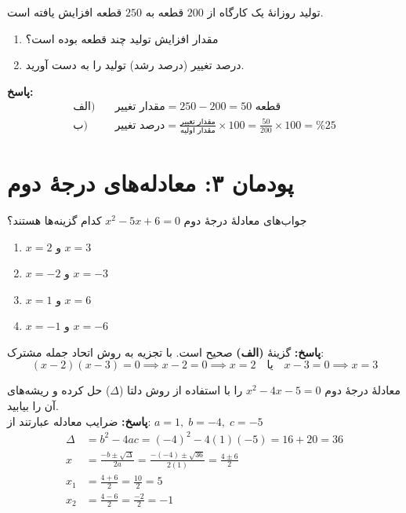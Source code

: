 \documentclass[a4paper,12pt]{article}
\begin{document}
\begin{tcolorbox}[title=\textbf{سؤال ۶ (تشریحی)}]
تولید روزانۀ یک کارگاه از $200$ قطعه به $250$ قطعه افزایش یافته است.
\begin{enumerate}[label=\textbf{\alph*)}]
    \item مقدار افزایش تولید چند قطعه بوده است؟
    \item درصد تغییر (درصد رشد) تولید را به دست آورید.
\end{enumerate}
\textbf{پاسخ:}
\begin{align*}
\text{الف)} \quad & \text{مقدار تغییر} = 250 - 200 = 50 \text{ قطعه} \\
\text{ب)} \quad & \text{درصد تغییر} = \frac{\text{مقدار تغییر}}{\text{مقدار اولیه}} \times 100 = \frac{50}{200} \times 100 = \%25
\end{align*}
\end{tcolorbox}

\newpage

\section*{پودمان ۳: معادله‌های درجۀ دوم}

\begin{tcolorbox}[title=\textbf{سؤال ۷ (تستی)}]
جواب‌های معادلۀ درجۀ دوم $x^2 - 5x + 6 = 0$ کدام گزینه‌ها هستند؟
\begin{enumerate}[label=\textbf{(\alph*)}]
    \item $x = 2$ و $x = 3$
    \item $x = -2$ و $x = -3$
    \item $x = 1$ و $x = 6$
    \item $x = -1$ و $x = -6$
\end{enumerate}
\textbf{پاسخ:} گزینۀ \textbf{(الف)} صحیح است. با تجزیه به روش اتحاد جمله مشترک:
\[ (x-2)(x-3) = 0 \implies x - 2 = 0 \implies x = 2 \quad \text{یا} \quad x - 3 = 0 \implies x = 3 \]
\end{tcolorbox}

\begin{tcolorbox}[title=\textbf{سؤال ۸ (تشریحی)}]
معادلۀ درجۀ دوم $x^2 - 4x - 5 = 0$ را با استفاده از روش دلتا ($\Delta$) حل کرده و ریشه‌های آن را بیابید.
\\
\textbf{پاسخ:}
ضرایب معادله عبارتند از: $a = 1, \; b = -4, \; c = -5$
\begin{align*}
\Delta &= b^2 - 4ac = (-4)^2 - 4(1)(-5) = 16 + 20 = 36 \\
x &= \frac{-b \pm \sqrt{\Delta}}{2a} = \frac{-(-4) \pm \sqrt{36}}{2(1)} = \frac{4 \pm 6}{2} \\
x_1 &= \frac{4 + 6}{2} = \frac{10}{2} = 5 \\
x_2 &= \frac{4 - 6}{2} = \frac{-2}{2} = -1
\end{align*}
\end{tcolorbox}
\end{document}
